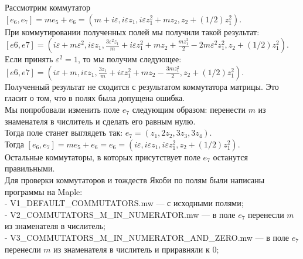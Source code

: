 \documentclass[12pt]{article}
\begin{document}
Рассмотрим коммутатор $[e_6, e_7] = me_5 + e_6 = (m + i \varepsilon, i \varepsilon z_1, i \varepsilon z_1^2 + mz_2, z_2 + (1/2)z_1^2)$. \\

При коммутировании полученных полей мы получили такой результат: \\

$[e6, e7] = \left(i \varepsilon + m \varepsilon^2, i \varepsilon z_1, \frac{3 \varepsilon^2 z_1}{m} + i \varepsilon z_1^2 + m z_2 + \frac{m z_1^2}{2} - 2 m \varepsilon^2 z_1^2, z_2 + (1/2)z_1^2 \right)$. \\

Если принять $\varepsilon^2 = 1$, то мы получим следующее: \\

$[e6, e7] = \left(i \varepsilon + m, i \varepsilon z_1, \frac{3 z_1}{m} + i \varepsilon z_1^2 + m z_2 - \frac{3m z_1^2}{2}, z_2 + (1/2)z_1^2 \right)$. \\

Полученный результат не сходится с результатом коммутатора матрицы. Это гласит о том, что в полях была допущена ошибка. \\

Мы попробовали изменить поле $e_7$ следующим образом: перенести $m$ из знаменателя в числитель и сделать его равным нулю. \\

Тогда поле станет выглядеть так: $e_7 = (z_1, 2z_2, 3z_3, 3z_4).$ \\

Тогда $[e_6, e_7] = me_5 + e_6 = e_6 = \left(i \varepsilon, i \varepsilon z_1, i \varepsilon z_1^2, z_2 + (1/2)z_1^2 \right).$ \\

Остальные коммутаторы, в которых присутствует поле $e_7$ останутся правильными. \\

Для проверки коммутаторов и тождеств Якоби по полям были написаны программы на Maple: \\

- V1_DEFAULT_COMMUTATORS.mw — с исходными полями; \\

- V2_COMMUTATORS_M_IN_NUMERATOR.mw — в поле $e_7$ перенесли $m$ из знаменателя в числитель; \\

- V3_COMMUTATORS_M_IN_NUMERATOR_AND_ZERO.mw — в поле $e_7$ перенесли $m$ из знаменателя в числитель и приравняли к 0; \\
\end{document}
